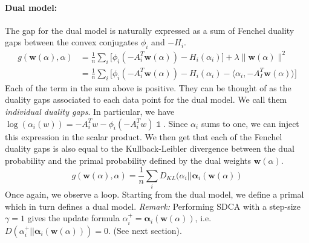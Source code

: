 \documentclass{article}
\DeclareMathOperator{\1}{\mathbb{1}}
\begin{document}
\paragraph{Dual model:}
The gap for the dual model is naturally expressed as a sum of Fenchel duality gaps between the convex conjugates $\phi_i$ and $-H_i$. 
\begin{align*}
	g(\bm w(\alpha),\alpha) 
	& = \frac{1}{n} \sum_i \big [ \phi_i(-A_i^T \bm w(\alpha)) - H_i(\alpha_i) \big ] + \lambda \|\bm w(\alpha)\|^2 \\
	& =  \frac{1}{n} \sum_i \big [ \phi_i(-A_i^T \bm w(\alpha)) - H_i(\alpha_i) - \langle \alpha_i,  -A_I^T \bm w(\alpha) \rangle \big ]
\end{align*}
Each of the term in the sum above is positive.
They can be thought of as the duality gaps associated to each data point for the dual model.
We call them \textit{individual duality gaps}.
In particular, we have $\log(\alpha_i(w)) = -A_i^Tw - \phi_i(-A_i^Tw) \1$. Since $\alpha_i$ sums to one, we can inject this expression in the scalar product. We then get that each of the Fenchel duality gaps is also equal to the Kullback-Leibler divergence between the dual probability and the primal probability defined by the dual weights $\bm w(\alpha)$.
\begin{equation}
	\label{dual duality gaps}
	g(\bm w(\alpha),\alpha) = \frac{1}{n} \sum_i D_{KL} (\alpha_i || \bm \alpha_i(\bm w(\alpha))
\end{equation}
Once again, we observe a loop. Starting from the dual model, we define a primal which in turn defines a dual model.
\textit{Remark:} Performing SDCA with a step-size $\gamma=1$ gives the update formula $\alpha_i^+ = \bm \alpha_i(\bm w(\alpha))$, i.e. $ D(\alpha_i^+ || \bm \alpha_i(\bm w(\alpha)) )=0$. (See next section).

\end{document}
